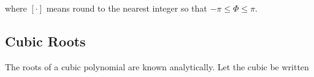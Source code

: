 \noindent where $[\cdot ]$ means round to the nearest integer so that $-\pi \le \Phi \le \pi$. %

{\footnotesize
{}
}


%
%
%
%
%
%
%

\clearpage
\newpage
\subsection{Cubic Roots}

The roots of a cubic polynomial are known analytically. Let the cubic be written

